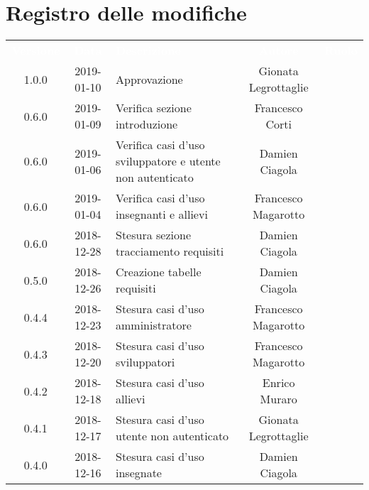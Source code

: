 \section*{Registro delle modifiche}
{
	\renewcommand{\arraystretch}{1.5}
	\centering
	\begin{longtable}{ c c C{6cm} c c }
		\textcolor{white}{\textbf{Versione}} & \textcolor{white}{\textbf{Data}} & \textcolor{white}{\textbf{Descrizione}} & \textcolor{white}{\textbf{Autore}} & \textcolor{white}{\textbf{Ruolo}}\\

		1.0.0 &
		2019-01-10 &
		Approvazione &	
		Gionata Legrottaglie&	
		\Res{} \\
		
		0.6.0 & 
		2019-01-09 &  
		Verifica sezione introduzione &	
		Francesco Corti&	
		\ver{} \\
		
		0.6.0 & 
		2019-01-06 &  
		Verifica casi d'uso sviluppatore e utente non autenticato& 	
		Damien Ciagola  &	
		\ver{} \\
		
		0.6.0 & 
		2019-01-04 &  
		Verifica casi d'uso insegnanti e allievi & 
		Francesco Magarotto  &
		\ver{}  \\
		
		0.6.0 & 
		2018-12-28 &  
		Stesura sezione tracciamento requisiti &	
		Damien Ciagola &	
		\ana{} \\
		
		0.5.0 & 
		2018-12-26 &  
		Creazione tabelle requisiti&	
		Damien Ciagola &	
		\ana{} \\
		
		0.4.4 & 
		2018-12-23 &  
		Stesura casi d'uso amministratore &	
		Francesco Magarotto &	
		\ana{} \\
		
		0.4.3 & 
		2018-12-20 &  
		Stesura casi d'uso sviluppatori &	
		Francesco Magarotto &	
		\ana{} \\
		
		0.4.2 & 
		2018-12-18 &  
		Stesura casi d'uso allievi &	
		Enrico Muraro	&	
		\ana{} \\	
		
		0.4.1 & 
		2018-12-17 &  
		Stesura casi d'uso utente non autenticato &	
		Gionata Legrottaglie &	
		\ana{} \\
		
		0.4.0 & 
		2018-12-16 &  
		Stesura casi d'uso insegnate &	
		Damien Ciagola &	
		\ana{} \\
		

\end{longtable}}
